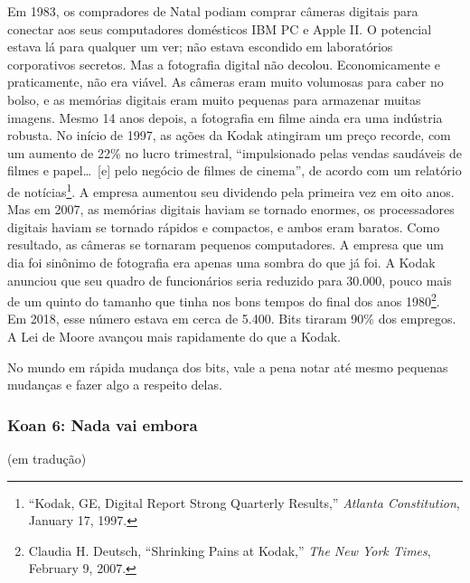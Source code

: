 Em 1983, os compradores de Natal podiam comprar câmeras digitais para conectar 
aos seus computadores domésticos IBM PC e Apple II. O potencial estava lá para 
qualquer um ver; não estava escondido em laboratórios corporativos secretos. Mas 
a fotografia digital não decolou. Economicamente e praticamente, não era viável.
As câmeras eram muito volumosas para caber no bolso, e as memórias digitais eram
muito pequenas para armazenar muitas imagens. Mesmo 14 anos depois, a fotografia
em filme ainda era uma indústria robusta. No início de 1997, as ações da Kodak
atingiram um preço recorde, com um aumento de 22\% no lucro trimestral, 
``impulsionado pelas vendas saudáveis de filmes e papel\ldots\ [e] pelo negócio
de filmes de cinema'', de acordo com um relatório de notícias\footnote{``Kodak,
GE, Digital Report Strong Quarterly Results,'' \textit{Atlanta Constitution},
January 17, 1997.}. A empresa aumentou seu dividendo pela primeira vez em oito
anos. Mas em 2007, as memórias digitais haviam se tornado enormes, os 
processadores digitais haviam se tornado rápidos e compactos, e ambos eram 
baratos. Como resultado, as câmeras se tornaram pequenos computadores. A empresa 
que um dia foi sinônimo de fotografia era apenas uma sombra do que já foi. A 
Kodak anunciou que seu quadro de funcionários seria reduzido para 30.000, pouco 
mais de um quinto do tamanho que tinha nos bons tempos do final dos anos
1980\footnote{Claudia H. Deutsch, ``Shrinking Pains at Kodak,'' \textit{The New
York Times}, February 9, 2007.}. Em 2018, esse número estava em cerca de 5.400.
Bits tiraram 90\% dos empregos. A Lei de Moore avançou mais rapidamente do que a
Kodak.

No mundo em rápida mudança dos bits, vale a pena notar até mesmo pequenas
mudanças e fazer algo a respeito delas.


\subsubsection*{Koan 6: Nada vai embora}
(em tradução)
